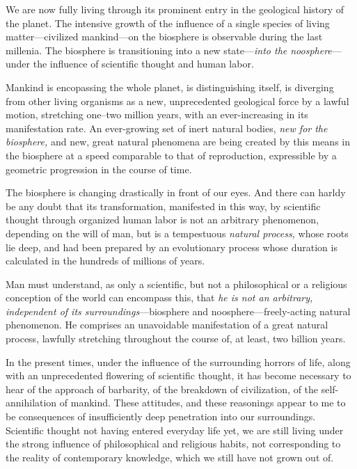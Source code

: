 We are now fully living through its prominent entry in the geological history
of the planet.  The intensive growth of the influence of a single species of
living matter---civilized
mankind---on the biosphere is observable during the last millenia.  The
biosphere is transitioning into a new state---\emph{into the noosphere}---under
the influence of scientific thought and human labor.

Mankind is encopassing the whole planet, is distinguishing itself, is diverging
from other living organisms as a new, unprecedented geological force by a
lawful motion, stretching one--two million years, with an ever-increasing in
its manifestation rate.  An ever-growing set of inert natural bodies, \emph{new
for the biosphere,} and new, great natural phenomena are being created by this
means in the biosphere at a speed comparable to that of reproduction,
expressible by a geometric progression in the course of time.

The biosphere is changing drastically in front of our eyes.  And there can
harldy be any doubt that its transformation, manifested in this way, by
scientific thought through organized human labor is not an arbitrary
phenomenon, depending on the will of man, but is a tempestuous
\emph{natural process,} whose
roots lie deep, and had been prepared by an evolutionary process whose duration
is calculated in the hundreds of millions of years.

Man must understand, as only a scientific, but not a philosophical or a
religious conception of the world can encompass this, that \emph{he is not an
arbitrary, independent of its surroundings}---biosphere and
noosphere---freely-acting natural phenomenon.  He comprises an unavoidable
manifestation of a great natural process, lawfully stretching throughout the
course of, at least, two billion years.

In the present times, under the influence of the surrounding horrors of life,
along with an unprecedented flowering of scientific thought, it has become
necessary to hear of the approach of barbarity, of the breakdown of
civilization, of the self-annihilation of mankind.  These attitudes, and these
reasonings appear to me to be consequences of insufficiently deep penetration
into our surroundings.  Scientific thought not having entered everyday life
yet, we are still living under the strong influence of philosophical and
religious habits, not corresponding to the reality of contemporary knowledge,
which we still have not grown out of.


